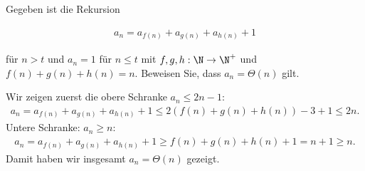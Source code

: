 
\begin{exercise}

Gegeben ist die Rekursion

\begin{align*}
  a_n = a_{f(n)} + a_{g(n)} + a_{h(n)} + 1
\end{align*}

für $n > t$ und $a_n = 1$ für $n \leq t$ mit $f,g,h: \N \rightarrow \N^+$ und $f(n) + g(n) + h(n) = n$. Beweisen Sie, dass $a_n = \Theta(n)$ gilt.
\end{exercise}


\begin{solution}
Wir zeigen zuerst die obere Schranke $a_n \leq 2n - 1$:
\begin{align*}
  a_n = a_{f(n)} + a_{g(n)} + a_{h(n)} + 1 \leq 2(f(n) + g(n) + h(n)) - 3 + 1 \leq 2n.
\end{align*}
Untere Schranke: $a_n \geq n$:
\begin{align*}
  a_n = a_{f(n)} + a_{g(n)} + a_{h(n)} + 1 \geq f(n) + g(n) + h(n) + 1 = n + 1 \geq n.
\end{align*}
Damit haben wir insgesamt $a_n = \Theta(n)$ gezeigt.
\end{solution}


